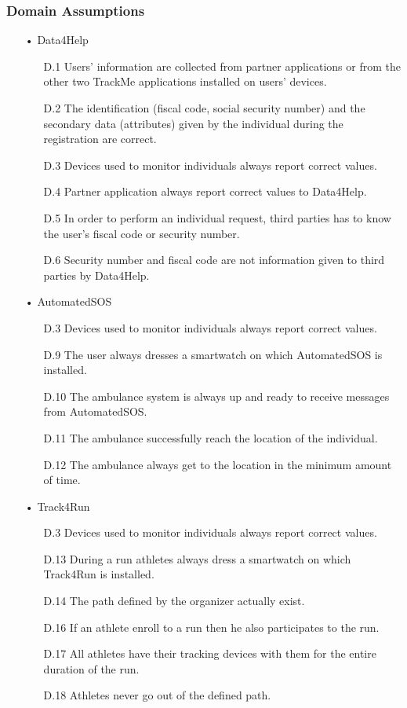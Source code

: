 \subsubsection{Domain Assumptions}
\begin{enumerate}

\item[•] {\Large Data4Help}
	\begin{enumerate}
	\item [D.1] Users' information are collected from partner applications or from the other two TrackMe applications installed on users' devices.
	\item [D.2] The identification (fiscal code, social security number) and the secondary data (attributes) given by the individual during the registration are correct.
    \item [D.3] Devices used to monitor individuals always report correct values.
    \item [D.4] Partner application always report correct values to Data4Help.
	\item [D.5] In order to perform an individual request, third parties has to know the user's fiscal code or security number.
	\item [D.6] Security number and fiscal code are not information given to third parties by Data4Help.
	\end{enumerate}
	
\item[•] {\Large AutomatedSOS}
	\begin{enumerate}
	\item [D.3] Devices used to monitor individuals always report correct values.
	\item [D.9] The user always dresses a smartwatch on which AutomatedSOS is installed.    
	\item [D.10] The ambulance system is always up and ready to receive messages from AutomatedSOS.
    \item [D.11] The ambulance successfully reach the location of the individual.
    \item [D.12] The ambulance always get to the location in the minimum amount of time.
    
	\end{enumerate}
	
\item[•] {\Large Track4Run}
	\begin{enumerate}
	\item [D.3] Devices used to monitor individuals always report correct values.
	\item [D.13] During a run athletes always dress a smartwatch on which Track4Run is installed.
	\item [D.14] The path defined by the organizer actually exist.
    \item [D.16] If an athlete enroll to a run then he also participates to the run.
    \item [D.17] All athletes have their tracking devices with them for the entire duration of the run.
    \item [D.18] Athletes never go out of the defined path.
	\end{enumerate}
\end{enumerate}